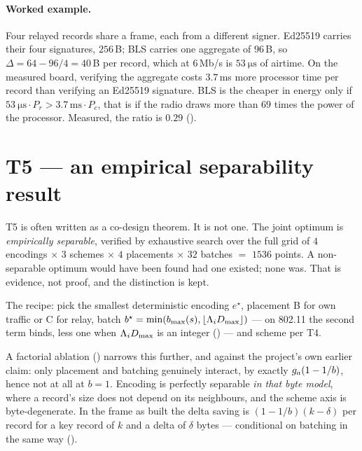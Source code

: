 \paragraph{Worked example.} Four relayed records share a frame, each from a different signer.
Ed25519 carries their four signatures, $256$\,B; BLS carries one aggregate of $96$\,B, so
$\Delta = 64 - 96/4 = 40$\,B per record, which at $6$\,Mb/s is $\SI{53}{\micro\second}$ of
airtime. On the measured board, verifying the aggregate costs $3.7$\,ms more processor time
per record than verifying an Ed25519 signature. BLS is the cheaper in energy only if
$\SI{53}{\micro\second} \cdot P_r > 3.7\,\mathrm{ms} \cdot P_c$, that is if the radio draws
more than $69$ times the power of the processor. Measured, the ratio is $0.29$
().

\section{T5 --- an empirical separability result}

\begin{remark}
T5 is often written as a co-design theorem. It is not one. The joint optimum is \emph{empirically
separable}, verified by exhaustive search over the full grid of $4$ encodings $\times$ $3$ schemes
$\times$ $4$ placements $\times$ $32$ batches $=$ $1536$ points. A non-separable optimum would have
been found had one existed; none was. That is evidence, not proof, and the distinction is kept.
\end{remark}

The recipe: pick the smallest deterministic encoding $e^\star$, placement B for own traffic or C
for relay, batch $b^\star = \min(b_{\max}(s), \lfloor \Lambda_i D_{\max} \rfloor)$ --- on 802.11 the
second term binds, less one when $\Lambda_i D_{\max}$ is an integer () --- and scheme
per T4.

A factorial ablation () narrows this further, and against the project's own
earlier claim: only placement and batching genuinely interact, by exactly $g_a(1 - 1/b)$, hence not
at all at $b = 1$. Encoding is perfectly separable \emph{in that byte model}, where a record's
size does not depend on its neighbours, and the scheme axis is byte-degenerate. In the frame as
built the delta saving is $(1 - 1/b)(k - \delta)$ per record for a key record of $k$ and a delta of
$\delta$ bytes --- conditional on batching in the same way ().

